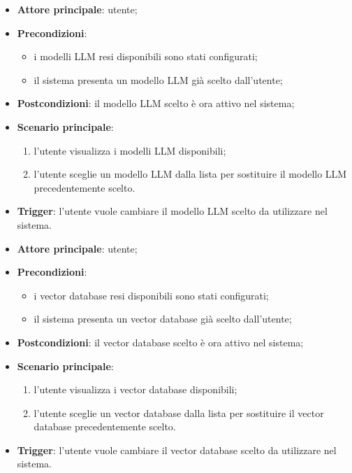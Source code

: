 \documentclass[10pt, a4paper]{article}
\begin{document}
    \begin{itemize}
        \item \textbf{Attore principale}: utente;
        \item \textbf{Precondizioni}: 
        \begin{itemize}
            \item i modelli LLM resi disponibili sono stati configurati;
            \item il sistema presenta un modello LLM già scelto dall'utente;
        \end{itemize}
        \item \textbf{Postcondizioni}: il modello LLM scelto è ora attivo nel sistema;
        \item \textbf{Scenario principale}:
            \begin{enumerate}
                \item l’utente visualizza i modelli LLM disponibili;
                \item l’utente sceglie un modello LLM dalla lista per sostituire il modello LLM precedentemente scelto.
            \end{enumerate}
        \item \textbf{Trigger}: l’utente vuole cambiare il modello LLM scelto da utilizzare nel sistema.
    \end{itemize}

    \begin{itemize}
        \item \textbf{Attore principale}: utente;
        \item \textbf{Precondizioni}: 
        \begin{itemize}
            \item i vector database resi disponibili sono stati configurati;
            \item il sistema presenta un vector database già scelto dall'utente;
        \end{itemize}
        \item \textbf{Postcondizioni}: il vector database scelto è ora attivo nel sistema;
        \item \textbf{Scenario principale}:
            \begin{enumerate}
                \item l’utente visualizza i vector database disponibili;
                \item l’utente sceglie un vector database dalla lista per sostituire il vector database precedentemente scelto.
            \end{enumerate}
        \item \textbf{Trigger}: l’utente vuole cambiare il vector database scelto da utilizzare nel sistema.
    \end{itemize}
\end{document}
